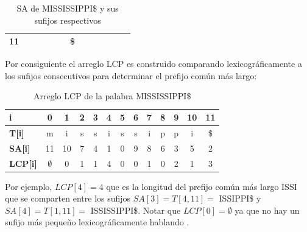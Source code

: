 \begin{table}[h]
\begin{tabular}{|l|l|l|l|l|l|l|l|l|l|l|l|l|}
\textbf{11}                                                      &                         &                         &                        &                        &                        & \$                      &                        &                        &                        &                        &                         &                         \\ \hline
\end{tabular}
\caption{SA de MISSISSIPPI\$ y sus sufijos respectivos}
\end{table}

Por consiguiente el arreglo LCP es construido comparando lexicográficamente a los sufijos consecutivos para determinar el prefijo común más largo:

\begin{table}[h]
\centering
\label{my-label11}
\begin{tabular}{|l|c|c|c|c|c|c|c|c|c|c|c|c|}
\hline
\textbf{i}         & 0  & 1  & 2 & 3 & 4 & 5 & 6 & 7 & 8 & 9 & 10 & 11 \\ \hline
\textbf{T{[}i{]}}  & m  & i  & s & s & i & s & s & i & p & p & i  & \$  \\ \hline
\textbf{SA{[}i{]}} & 11 & 10 & 7 & 4 & 1 & 0 & 9 & 8 & 6 & 3 & 5  & 2  \\ \hline
\textbf{LCP{[}i{]}} & $\emptyset$  & 0  & 1 & 1 & 4 & 0 & 0 & 1 & 0 & 2 & 1  & 3  \\ \hline
\end{tabular}
\caption{Arreglo LCP de la palabra MISSISSIPPI\$}
\end{table}

Por ejemplo, $LCP[4] = 4$ que es la longitud del prefijo común más largo ISSI que se comparten entre los sufijos $SA[3] = T[4,11] =$ ISSIPPI\$ y $SA[4] = T[1,11] =$ ISSISSIPPI\$. Notar que $LCP[0] = \emptyset$ ya que no hay un sufijo más pequeño lexicográficamente hablando \cite{lcparray}.